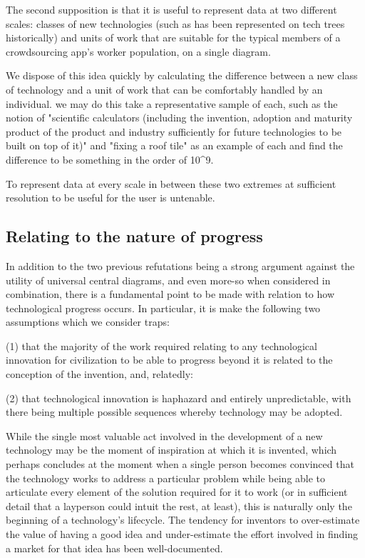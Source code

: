 \documentclass{article}
\begin{document}
The second supposition is that it is useful to represent data at two different scales: classes of new technologies (such as has been represented on tech trees historically) and units of work that are suitable for the typical members of a crowdsourcing app's worker population, on a single diagram.

We dispose of this idea quickly by calculating the difference between a new class of technology and a unit of work that can be comfortably handled by an individual. we may do this take a representative sample of each, such as the notion of "scientific calculators (including the invention, adoption and maturity product of the product and industry sufficiently for future technologies to be built on top of it)" and "fixing a roof tile" as an example of each and find the difference to be something in the order of 10^9.

To represent data at every scale in between these two extremes at sufficient resolution to be useful for the user is untenable.

\subsection{Relating to the nature of progress}

In addition to the two previous refutations being a strong argument against the utility of universal central diagrams, and even more-so when considered in combination, there is a fundamental point to be made with relation to how technological progress occurs. In particular, it is make the following two assumptions which we consider traps:

(1) that the majority of the work required relating to any technological innovation for civilization to be able to progress beyond it is related to the conception of the invention, and, relatedly:

(2) that technological innovation is haphazard and entirely unpredictable, with there being multiple possible sequences whereby technology may be adopted.

While the single most valuable act involved in the development of a new technology may be the moment of inspiration at which it is invented, which perhaps concludes at the moment when a single person becomes convinced that the technology works to address a particular problem while being able to articulate every element of the solution required for it to work (or in sufficient detail that a layperson could intuit the rest, at least), this is naturally only the beginning of a technology's lifecycle.  The tendency for inventors to over-estimate the value of having a good idea and under-estimate the effort involved in finding a market for that idea has been well-documented.
\end{document}
